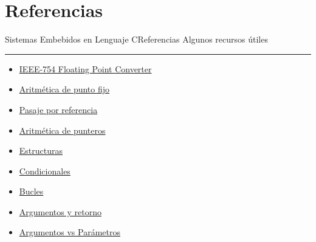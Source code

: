 \documentclass[aspectratio=169, xcolor=dvipsnames]{beamer}
\begin{document}
\section{Referencias}
\begin{frame}{Sistemas Embebidos en Lenguaje C}{Referencias}
    Algunos recursos útiles
    \noindent\rule{\textwidth}{0.75pt}
    \begin{multicols}{2}
    \begin{itemize}
        \item \href{https://www.h-schmidt.net/FloatConverter/IEEE754.html}{IEEE-754 Floating Point Converter}
        \item \href{https://vanhunteradams.com/FixedPoint/FixedPoint.html}{Aritmética de punto fijo}
        \item \href{https://www.geeksforgeeks.org/pass-by-reference-in-c/}{Pasaje por referencia}
        \item \href{https://www.geeksforgeeks.org/pointer-arithmetics-in-c-with-examples/}{Aritmética de punteros}
        \item \href{https://www.geeksforgeeks.org/structures-c/}{Estructuras}
        \item \href{https://unstop.com/blog/conditional-if-else-statements-in-c}{Condicionales}
        \item \href{https://www.geeksforgeeks.org/c-loops/}{Bucles}
        \item \href{https://www.geeksforgeeks.org/c-function-argument-return-values/}{Argumentos y retorno}
        \item \href{https://www.shiksha.com/online-courses/articles/difference-between-argument-and-parameter-blogId-147937}{Argumentos vs Parámetros}
    \end{itemize}
    \end{multicols}
\end{frame}
\end{document}
